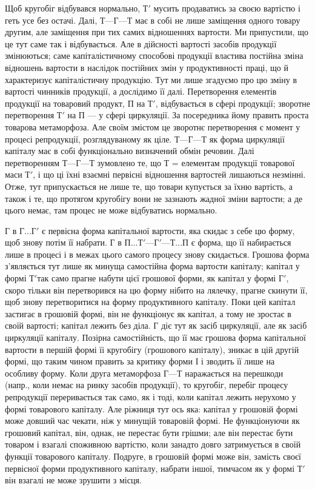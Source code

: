 Щоб кругобіг відбувався нормально, $Т'$ мусить продаватись за своєю
вартістю і геть усе без остачі. Далі, $Т — Г — Т$ має в собі не лише заміщення
одного товару другим, але заміщення при тих самих відношеннях
вартости. Ми припустили, що це тут саме так і відбувається. Але в дійсності
вартості засобів продукції змінюються; саме капіталістичному способові
продукції властива постійна зміна відношень вартости в наслідок постійних
змін у продуктивності праці, що й характеризує капіталістичну
продукцію. Тут ми лише згадуємо про цю зміну в вартості чинників
продукції, а дослідимо її далі. Перетворення елементів продукції на
товаровий продукт, П на $Т'$, відбувається в сфері продукції; зворотне
перетворення $Т'$ на П — у сфері циркуляції. За посередника йому
править проста товарова метаморфоза. Але своїм змістом це зворотнє
перетворення є момент у процесі репродукції, розглядуваному як ціле.
$Т — Г — Т$ як форма циркуляції капіталу має в собі функціонально визначений
обмін речовин. Далі перетворенням $Т — Г — Т$ зумовлено те, що Т
= елементам продукції товарової маси $Т'$, і що ці їхні взаємні первісні
відношення вартостей лишаються незмінні. Отже, тут припускається не лише
те, що товари купується за їхню вартість, а також і те, що протягом
кругобігу вони не зазнають жадної зміни вартости; а де цього немає,
там процес не може відбуватись нормально.

Г в $Г... Г'$ є первісна форма капітальної вартости, яка скидає з себе
цю форму, щоб знову потім її набрати. Г в $П... Т' — Г' — Т... П$
є форма, що її набирається лише в процесі і в межах цього самого
процесу знову скидається. Грошова форма з’являється тут лише як минуща
самостійна форма вартости капіталу; капітал у формі $Т' т$ак само прагне
набути цієї грошової форми, як капітал у формі $Г'$, скоро тільки він перетворився
на цю форму нібито на лялечку, прагне скинути її, щоб знову перетворитися
на форму продуктивного капіталу. Поки цей капітал застигає в
грошовій формі, він не функціонує як капітал, а тому не зростає в своїй
вартості; капітал лежить без діла. Г діє тут як засіб циркуляції, але як засіб
циркуляції капіталу. Позірна самостійність, що її має грошова форма
капітальної вартости в першій формі їі кругобігу (грошового капіталу),
зникає в цій другій формі, що таким чином править за критику форми І і
зводить її лише на особливу форму. Коли друга метаморфоза $Г — Т$ наражається
на перешкоди (напр., коли немає на ринку засобів продукції),
то кругобіг, перебіг процесу репродукції переривається так само, як
і тоді, коли капітал лежить нерухомо у формі товарового капіталу. Але
ріжниця тут ось яка: капітал у грошовій формі може довший час чекати,
ніж у минущій товаровій формі. Не функціонуючи як грошовий капітал,
він, однак, не перестає бути грішми; але він перестає бути товаром
і взагалі споживною вартістю, коли занадто довго затримується в своїй
функції товарового капіталу. Подруге, в грошовій формі може він,
замість своєї первісної форми продуктивного капіталу, набрати іншої,
тимчасом як у формі $Т'$ він взагалі не може зрушити з місця.

